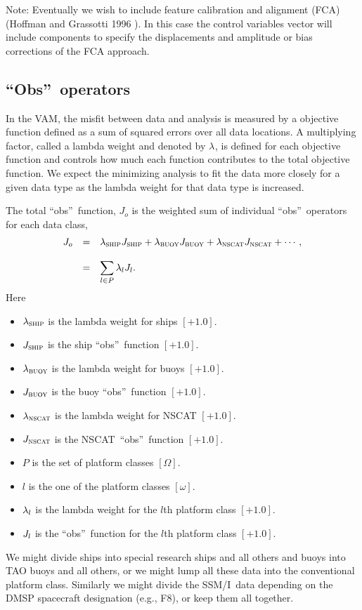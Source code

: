 \documentclass[11pt]{article}
\newcommand{\glm}[1]{\mbox{$ \lambda_{\mbox{\tiny #1}} $}}
\newcommand{\gl}[1]{\mbox{$ \lambda_{#1} $}}
\newcommand{\Jm}[1]{\mbox{$ J_{\mbox{\tiny #1}} $}}
\newcommand{\J}[1]{\mbox{$ J_{#1} $}}
\newcommand{\nscat}{NSCAT}
\newcommand{\Obs}{``Obs''}
\newcommand{\obs}{``obs''}
\newcommand{\ssmi}{SSM/I}
\newcommand{\vam}{VAM}
\newcommand{\xxx}[1]{\subsection {#1}}
\newcommand{\reference}[2]{(#1 \cite{#2})}
\newcommand{\eql}[2]{\begin{equation} \label{eq:#1} #2 \end{equation}}
\newcommand{\vardef}[3]{\item $ {#1} $ is the {#2} $ [{#3}] $. }
\newcommand{\subsc}[2]{\mbox{$ #1_{\mbox{\sc \footnotesize #2}} $}}
\renewcommand{\Jm}[1]{\subsc{J}{{#1}}}
\renewcommand{\glm}[1]{\subsc{\lambda}{{#1}}}
\begin{document}
Note: Eventually we wish to include feature calibration and alignment
(FCA) \reference{Hoffman and Grassotti 1996}{HofG96}.  In this case
the control variables vector will include components to specify the
displacements and amplitude or bias corrections of the FCA approach.

\xxx {\Obs\ operators}

In the \vam, the misfit between data and analysis is measured by a
objective function defined as a sum of squared errors over all data
locations.  A multiplying factor, called a lambda weight and denoted
by \gl{}, is defined for each objective function and controls how much
each function contributes to the total objective function.  We expect
the minimizing analysis to fit the data more closely for a given data
type as the lambda weight for that data type is increased.

The total \obs\ function, \J{o} is the weighted sum of individual
\obs\ operators for each data class,
 \eql{Jo}{ \begin{array}{ccl}
  J_o & = & \glm{ship} \Jm{ship} + \glm{buoy} \Jm{buoy} + 
  \glm{nscat} \Jm{nscat} + \cdots , \\ & & \\
      & = & \displaystyle \sum_{l \in P} \gl{l} \J{l} . \end{array} }
 Here \begin{itemize}
  \vardef{\glm{ship}}{lambda weight for ships}{+1.0}
  \vardef{\Jm{ship}}{ship \obs\ function}{+1.0}
  \vardef{\glm{buoy}}{lambda weight for buoys}{+1.0}
  \vardef{\Jm{buoy}}{buoy \obs\ function}{+1.0}
  \vardef{\glm{nscat}}{lambda weight for \nscat}{+1.0}
  \vardef{\Jm{nscat}}{\nscat\ \obs\ function}{+1.0}
  \vardef{P}{set of platform classes}{\Omega}
  \vardef{l}{one of the platform classes}{\omega}
  \vardef{\gl{l}}{lambda weight for the $l$th platform class}{+1.0}
  \vardef{\J{l}}{\obs\ function for the $l$th platform class}{+1.0}
 \end{itemize} 
 We might divide ships into special research ships and all others and
buoys into TAO buoys and all others, or we might lump all these data
into the conventional platform class.  Similarly we might divide the
\ssmi\ data depending on the DMSP spacecraft designation (e.g., F8),
or keep them all together.
\end{document}
